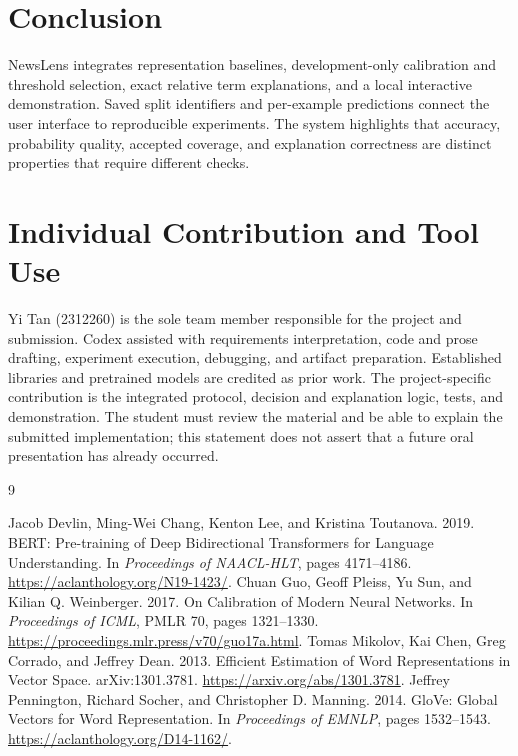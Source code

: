 \documentclass[11pt]{article}
\begin{document}
\section{Conclusion}
NewsLens integrates representation baselines, development-only calibration and threshold selection, exact relative term explanations, and a local interactive demonstration. Saved split identifiers and per-example predictions connect the user interface to reproducible experiments. The system highlights that accuracy, probability quality, accepted coverage, and explanation correctness are distinct properties that require different checks.

\section*{Individual Contribution and Tool Use}
Yi Tan (2312260) is the sole team member responsible for the project and submission. Codex assisted with requirements interpretation, code and prose drafting, experiment execution, debugging, and artifact preparation. Established libraries and pretrained models are credited as prior work. The project-specific contribution is the integrated protocol, decision and explanation logic, tests, and demonstration. The student must review the material and be able to explain the submitted implementation; this statement does not assert that a future oral presentation has already occurred.
\clearpage
\begin{thebibliography}{9}
\raggedright
{}
Jacob Devlin, Ming-Wei Chang, Kenton Lee, and Kristina Toutanova. 2019.
BERT: Pre-training of Deep Bidirectional Transformers for Language Understanding.
In \emph{Proceedings of NAACL-HLT}, pages 4171--4186.
\url{https://aclanthology.org/N19-1423/}.
Chuan Guo, Geoff Pleiss, Yu Sun, and Kilian Q. Weinberger. 2017.
On Calibration of Modern Neural Networks.
In \emph{Proceedings of ICML}, PMLR 70, pages 1321--1330.
\url{https://proceedings.mlr.press/v70/guo17a.html}.
Tomas Mikolov, Kai Chen, Greg Corrado, and Jeffrey Dean. 2013.
Efficient Estimation of Word Representations in Vector Space.
arXiv:1301.3781. \url{https://arxiv.org/abs/1301.3781}.
Jeffrey Pennington, Richard Socher, and Christopher D. Manning. 2014.
GloVe: Global Vectors for Word Representation.
In \emph{Proceedings of EMNLP}, pages 1532--1543.
\url{https://aclanthology.org/D14-1162/}.
\end{thebibliography}
\end{document}

